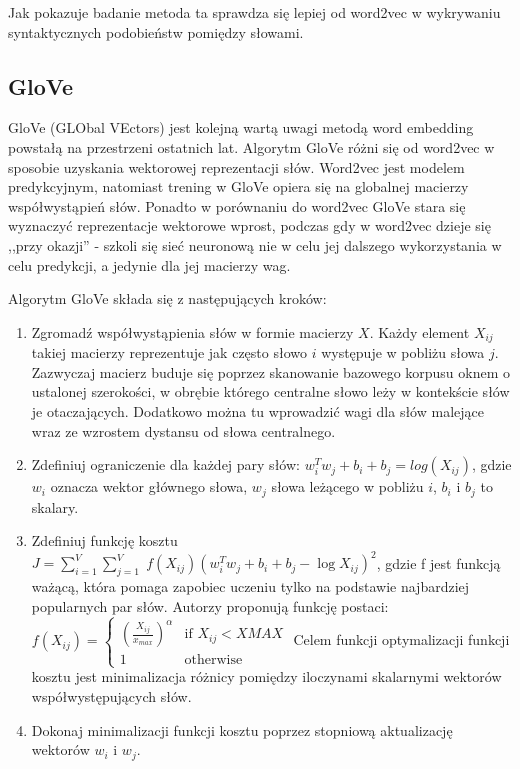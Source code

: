 \documentclass[pl]{minipw} %
\begin{document}
Jak pokazuje badanie\cite{fast_text_word2vec} metoda ta sprawdza się lepiej od word2vec w wykrywaniu syntaktycznych podobieństw pomiędzy słowami. 

\subsection{GloVe}

GloVe\cite{glove} (GLObal VEctors) jest kolejną wartą uwagi metodą word embedding powstałą na przestrzeni ostatnich lat. Algorytm GloVe różni się od word2vec w sposobie uzyskania wektorowej reprezentacji słów. Word2vec jest modelem predykcyjnym, natomiast trening w GloVe opiera się na globalnej macierzy współwystąpień słów. Ponadto w porównaniu do word2vec GloVe stara się wyznaczyć reprezentacje wektorowe wprost, podczas gdy w word2vec dzieje się ,,przy okazji'' - szkoli się sieć neuronową nie w celu jej dalszego wykorzystania w celu predykcji, a jedynie dla jej macierzy wag. 

Algorytm GloVe składa się z następujących kroków\cite{glove_cran}:
\begin{enumerate}
	\item Zgromadź współwystąpienia słów w formie macierzy $X$. Każdy element $X_{ij}$ takiej macierzy reprezentuje jak często słowo $i$ występuje w pobliżu słowa $j$. Zazwyczaj macierz buduje się poprzez skanowanie bazowego korpusu oknem o ustalonej szerokości, w obrębie którego centralne słowo leży w kontekście słów je otaczających. Dodatkowo można tu wprowadzić wagi dla słów malejące wraz ze wzrostem dystansu od słowa centralnego.
	\item Zdefiniuj ograniczenie dla każdej pary słów: $w_i^Tw_j + b_i + b_j = log(X_{ij})$, gdzie $w_i$ oznacza wektor głównego słowa, $w_j$ słowa leżącego w pobliżu $i$, $b_i$ i $b_j$ to skalary.
	\item Zdefiniuj funkcję kosztu $J = \sum_{i=1}^V \sum_{j=1}^V \; f(X_{ij}) ( w_i^T w_j + b_i + b_j - \log X_{ij})^2$, gdzie f jest funkcją ważącą, która pomaga zapobiec uczeniu tylko na podstawie najbardziej popularnych par słów. Autorzy proponują funkcję postaci:
	$f(X_{ij}) = 
	\begin{cases}
	(\frac{X_{ij}}{x_{max}})^\alpha & \text{if } X_{ij} < XMAX \\
	1 & \text{otherwise}
	\end{cases}$
	Celem funkcji optymalizacji funkcji	 kosztu jest minimalizacja różnicy pomiędzy iloczynami skalarnymi wektorów współwystępujących słów.
	\item Dokonaj minimalizacji funkcji kosztu poprzez stopniową aktualizację wektorów $w_i$ i $w_j$.
\end{enumerate}
\end{document}
